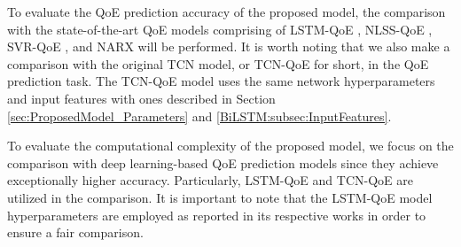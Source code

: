 To evaluate the QoE prediction accuracy of the proposed model, the comparison with the state-of-the-art QoE models comprising of LSTM-QoE \cite{QoEModel_LSTM}, NLSS-QoE \cite{QoEModel_NLSS}, SVR-QoE \cite{LFOVIA}, and NARX \cite{QoEModel_NARX_DynamicNetworks} will be performed.
It is worth noting that we also make a comparison with the original TCN model, or TCN-QoE for short, in the QoE prediction task.
The TCN-QoE model uses the same network hyperparameters and input features with ones described in Section \ref{sec:ProposedModel_Parameters} and \ref{BiLSTM:subsec:InputFeatures}.


To evaluate the computational complexity of the proposed model, we focus on the comparison with deep learning-based QoE prediction models since they achieve exceptionally higher accuracy.
Particularly, LSTM-QoE \cite{QoEModel_LSTM} and TCN-QoE are utilized in the comparison.
It is important to note that the LSTM-QoE \cite{QoEModel_LSTM} model hyperparameters are employed as reported in its respective works in order to ensure a fair comparison.
